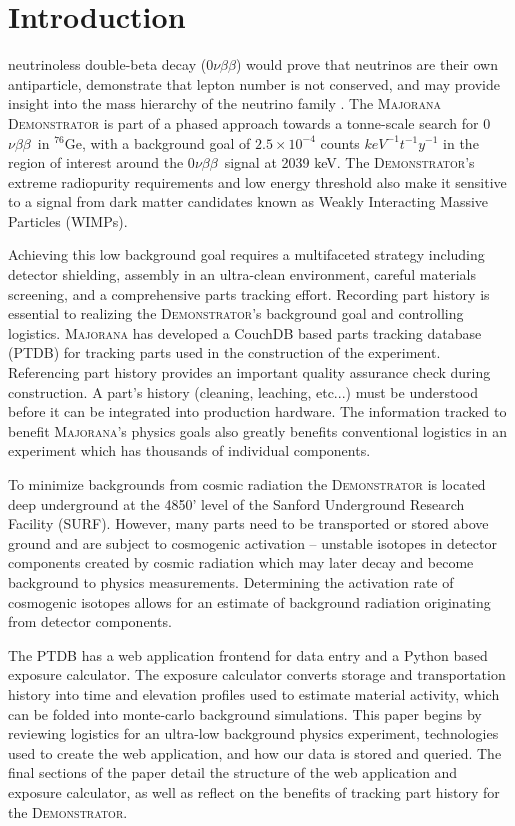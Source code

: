 \documentclass[journal]{IEEEtran}
\def\znbb{0$\nu\beta\beta$}
\def\ge76{$^{76}$Ge}
\begin{document}
\section{Introduction}
 neutrinoless double-beta decay (\znbb) would prove that neutrinos are their own antiparticle,
demonstrate that lepton number is not conserved, and may provide insight into
the mass hierarchy of the neutrino family \cite{phillips_mj} \cite{mj_wilkerson} \cite{avignone_neutrinos}.
The \textsc{Majorana Demonstrator} is part of a phased approach towards a tonne-scale search for \znbb\ in \ge76, with
a background goal of $2.5\times10^{-4}$ counts $keV^{-1} t^{-1} y^{-1}$ \cite{mj_wilkerson} in the region of interest
around the \znbb\ signal at 2039 keV.
The \textsc{Demonstrator}'s extreme radiopurity requirements and low energy threshold also make it sensitive to a signal from dark
matter candidates known as Weakly Interacting Massive Particles (WIMPs).

Achieving this low background goal requires a multifaceted strategy including detector shielding, assembly in an ultra-clean environment,
careful materials screening, and a comprehensive parts tracking effort.
Recording part history is essential to realizing the \textsc{Demonstrator}'s background goal and controlling logistics.
\textsc{Majorana} has developed a CouchDB  \cite{couchdb_guide} based parts tracking database (PTDB)
for tracking parts used in the construction of the experiment. 
Referencing part history provides an important quality assurance check during 
construction. A part's history (cleaning, leaching, etc...) must be 
understood before it can be integrated into production hardware. The information tracked
to benefit \textsc{Majorana}'s physics goals also greatly benefits conventional logistics in an
experiment which has thousands of individual components.


To minimize backgrounds from cosmic radiation the \textsc{Demonstrator} is located deep underground
at the 4850' level of the Sanford Underground Research Facility (SURF).
However, many parts need to be transported or stored above ground and are subject to
cosmogenic activation -- unstable isotopes in detector components created by cosmic radiation which may later decay and become background
to physics measurements.
Determining the activation rate of cosmogenic isotopes allows for an estimate of background
radiation originating from detector components.

The PTDB has a web application frontend
for data entry and a Python based exposure calculator. The exposure calculator converts storage and transportation history 
into time and elevation profiles used to estimate
material activity, which can be folded into monte-carlo background simulations.
This paper begins by reviewing logistics for an ultra-low background
physics experiment, technologies used to create the web application, and
how our data is stored and queried. The final sections of the paper detail
the structure of the web application and exposure calculator, as well as reflect
on the benefits of tracking part history for the \textsc{Demonstrator}.
\end{document}
